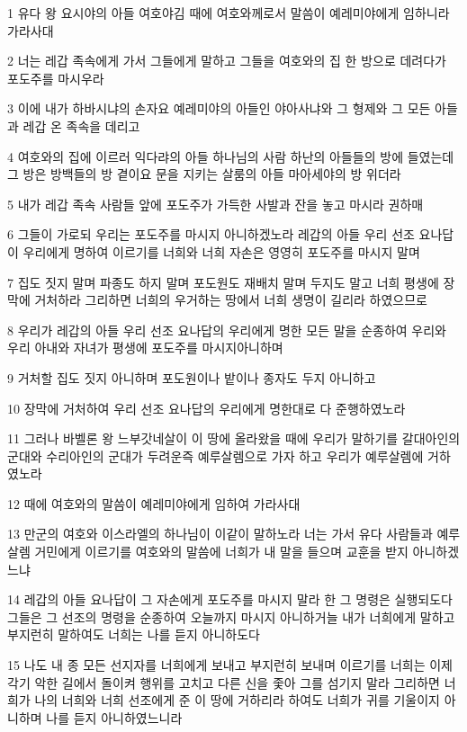 \par 1 유다 왕 요시야의 아들 여호야김 때에 여호와께로서 말씀이 예레미야에게 임하니라 가라사대
\par 2 너는 레갑 족속에게 가서 그들에게 말하고 그들을 여호와의 집 한 방으로 데려다가 포도주를 마시우라
\par 3 이에 내가 하바시냐의 손자요 예레미야의 아들인 야아사냐와 그 형제와 그 모든 아들과 레갑 온 족속을 데리고
\par 4 여호와의 집에 이르러 익다랴의 아들 하나님의 사람 하난의 아들들의 방에 들였는데 그 방은 방백들의 방 곁이요 문을 지키는 살룸의 아들 마아세야의 방 위더라
\par 5 내가 레갑 족속 사람들 앞에 포도주가 가득한 사발과 잔을 놓고 마시라 권하매
\par 6 그들이 가로되 우리는 포도주를 마시지 아니하겠노라 레갑의 아들 우리 선조 요나답이 우리에게 명하여 이르기를 너희와 너희 자손은 영영히 포도주를 마시지 말며
\par 7 집도 짓지 말며 파종도 하지 말며 포도원도 재배치 말며 두지도 말고 너희 평생에 장막에 거처하라 그리하면 너희의 우거하는 땅에서 너희 생명이 길리라 하였으므로
\par 8 우리가 레갑의 아들 우리 선조 요나답의 우리에게 명한 모든 말을 순종하여 우리와 우리 아내와 자녀가 평생에 포도주를 마시지아니하며
\par 9 거처할 집도 짓지 아니하며 포도원이나 밭이나 종자도 두지 아니하고
\par 10 장막에 거처하여 우리 선조 요나답의 우리에게 명한대로 다 준행하였노라
\par 11 그러나 바벨론 왕 느부갓네살이 이 땅에 올라왔을 때에 우리가 말하기를 갈대아인의 군대와 수리아인의 군대가 두려운즉 예루살렘으로 가자 하고 우리가 예루살렘에 거하였노라
\par 12 때에 여호와의 말씀이 예레미야에게 임하여 가라사대
\par 13 만군의 여호와 이스라엘의 하나님이 이같이 말하노라 너는 가서 유다 사람들과 예루살렘 거민에게 이르기를 여호와의 말씀에 너희가 내 말을 들으며 교훈을 받지 아니하겠느냐
\par 14 레갑의 아들 요나답이 그 자손에게 포도주를 마시지 말라 한 그 명령은 실행되도다 그들은 그 선조의 명령을 순종하여 오늘까지 마시지 아니하거늘 내가 너희에게 말하고 부지런히 말하여도 너희는 나를 듣지 아니하도다
\par 15 나도 내 종 모든 선지자를 너희에게 보내고 부지런히 보내며 이르기를 너희는 이제 각기 악한 길에서 돌이켜 행위를 고치고 다른 신을 좇아 그를 섬기지 말라 그리하면 너희가 나의 너희와 너희 선조에게 준 이 땅에 거하리라 하여도 너희가 귀를 기울이지 아니하며 나를 듣지 아니하였느니라
